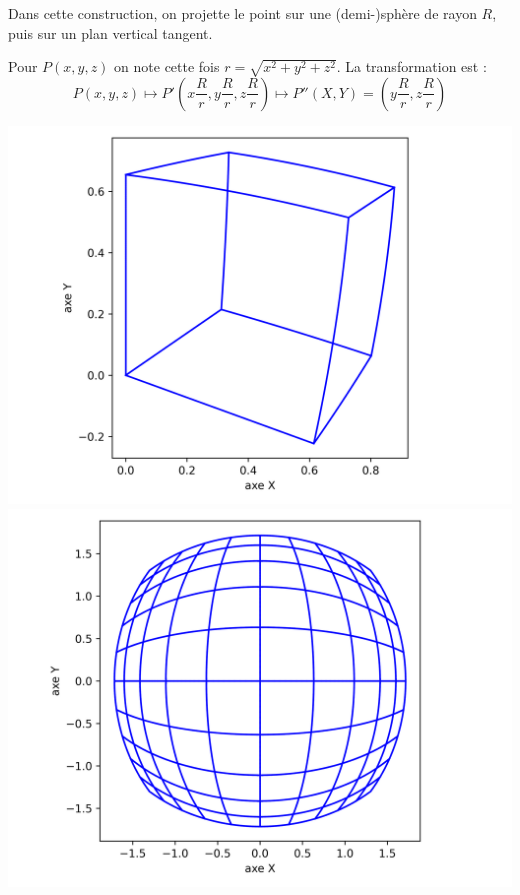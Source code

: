 \documentclass[11pt,class=report,crop=false]{standalone}
\begin{document}
Dans cette construction, on projette le point sur une (demi-)sphère de rayon $R$, puis sur un plan vertical tangent.




Pour $P(x,y,z)$ on note cette fois $r = \sqrt{x^2+y^2+z^2}$.
La transformation est :
$$P(x,y,z) \longmapsto P'\left(x \frac{R}{r},y \frac{R}{r}, z\frac{R}{r}\right) \longmapsto P''(X,Y) = \left(y \frac{R}{r},z \frac{R}{r}\right)$$


\begin{center}
	\includegraphics[scale=\myscale,scale=0.5]{figures/cube_curviligne_spherique}
	\includegraphics[scale=\myscale,scale=0.5]{figures/grille_curviligne_spherique}
\end{center}

\bigskip
\bigskip
\bigskip
\end{document}
